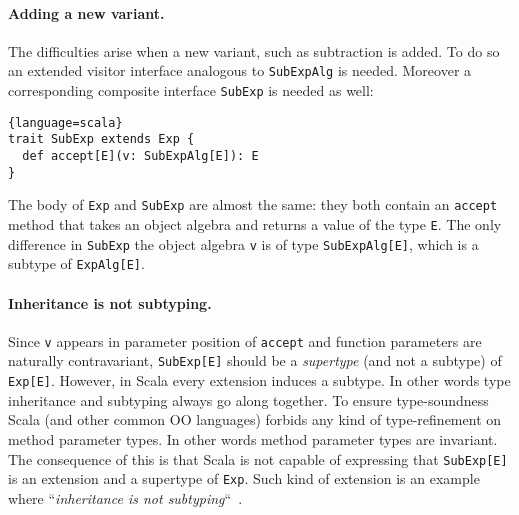 \begin{comment}
The actual shape of the expressions
(i.e., variants) is determined by the type of the visitor, which we define in
another trait:
\begin{lstlisting}{language=scala}
trait ExpVisitor[E] {
  def lit(x: Int): E
  def add(e1: E, e2: E): E
}
\end{lstlisting}
\end{comment}

\paragraph{Adding a new variant.}
The difficulties arise when a new variant, such as subtraction is
added. To do so an extended visitor interface analogous to
\lstinline$SubExpAlg$ is needed. Moreover a corresponding composite
interface \lstinline$SubExp$ is needed as well:
\begin{lstlisting}{language=scala}
trait SubExp extends Exp {
  def accept[E](v: SubExpAlg[E]): E
}
\end{lstlisting}
The body of \lstinline{Exp} and \lstinline{SubExp} are almost the same: they
both contain an \lstinline{accept} method that takes an object algebra
and returns a value of the type \lstinline{E}. The only difference in
\lstinline{SubExp} the object algebra
\lstinline{v} is of type \lstinline{SubExpAlg[E]}, which is a subtype of
\lstinline{ExpAlg[E]}.

\paragraph{Inheritance is not subtyping.}
Since \lstinline{v} appears in parameter position of
\lstinline{accept} and function parameters are naturally contravariant,
\lstinline{SubExp[E]} should be a \emph{supertype} (and not a subtype)
of \lstinline{Exp[E]}.  However, in Scala every extension induces a
subtype. In other words type inheritance and subtyping always go along
together.  To ensure type-soundness Scala (and other common OO
languages) forbids any kind of type-refinement on method parameter
types.  In other words method parameter types are invariant.
The consequence of this is that Scala is not capable of expressing
that \lstinline{SubExp[E]} is an extension and a supertype of
\lstinline{Exp}. Such kind of extension is an example where
``\emph{inheritance is not subtyping}``~\cite{cook1989inheritance}.

